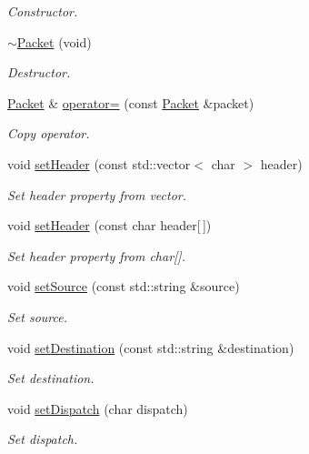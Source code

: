 \begin{DoxyCompactItemize}
\begin{DoxyCompactList}\small\item\em Constructor. \end{DoxyCompactList}\item 
\hyperlink{class_packet_a15a1f007e2e37e855e5533c27fc3fb7b}{$\sim$\-Packet} (void)
\begin{DoxyCompactList}\small\item\em Destructor. \end{DoxyCompactList}\item 
\hyperlink{class_packet}{Packet} \& \hyperlink{class_packet_a9b3ce351cdcb3bb7ae881df3101a4ee1}{operator=} (const \hyperlink{class_packet}{Packet} \&packet)
\begin{DoxyCompactList}\small\item\em Copy operator. \end{DoxyCompactList}\item 
void \hyperlink{class_packet_acf3e7bee5ebd03fdc928b49b763f6371}{set\-Header} (const std\-::vector$<$ char $>$ header)
\begin{DoxyCompactList}\small\item\em Set header property from vector. \end{DoxyCompactList}\item 
void \hyperlink{class_packet_ab41c57cd980743aae774f8b844da7621}{set\-Header} (const char header\mbox{[}$\,$\mbox{]})
\begin{DoxyCompactList}\small\item\em Set header property from char\mbox{[}\mbox{]}. \end{DoxyCompactList}\item 
void \hyperlink{class_packet_ad8aa839a313442aede56019f3eca6017}{set\-Source} (const std\-::string \&source)
\begin{DoxyCompactList}\small\item\em Set source. \end{DoxyCompactList}\item 
void \hyperlink{class_packet_a3adcb9c08d562129f3562c6505aef8ec}{set\-Destination} (const std\-::string \&destination)
\begin{DoxyCompactList}\small\item\em Set destination. \end{DoxyCompactList}\item 
void \hyperlink{class_packet_a93698da3726e1fd1e57ae75cf51a28ea}{set\-Dispatch} (char dispatch)
\begin{DoxyCompactList}\small\item\em Set dispatch. \end{DoxyCompactList}\item 

\end{DoxyCompactItemize}
